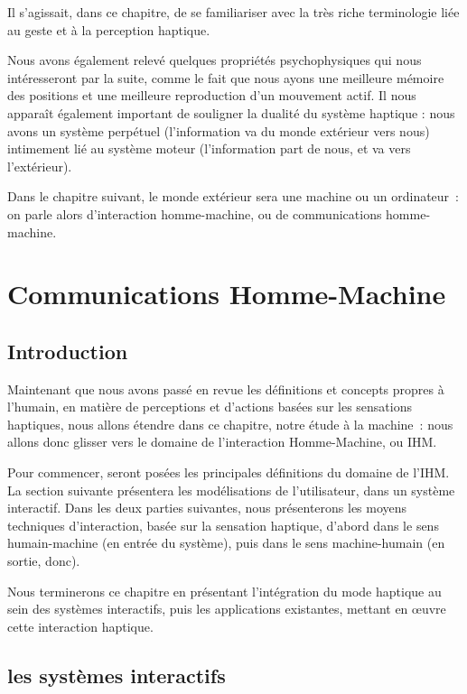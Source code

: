 \documentclass[
]{book}
\begin{document}
Il s'agissait, dans ce chapitre, de se familiariser avec la très riche
terminologie liée au geste et à la perception haptique.

Nous avons également relevé quelques propriétés psychophysiques qui nous
intéresseront par la suite, comme le fait que nous ayons une meilleure
mémoire des positions et une meilleure reproduction d'un mouvement actif. Il
nous apparaît également important de souligner la dualité du système haptique
: nous avons un système perpétuel (l'information va du monde extérieur vers
nous) intimement lié au système moteur (l'information part de nous, et va
vers l'extérieur).

Dans le chapitre suivant, le monde extérieur sera une machine ou un
ordinateur~: on parle alors d'interaction homme-machine, ou de communications
homme-machine.

\hypertarget{communications-homme-machine}{%
\chapter{Communications Homme-Machine}\label{communications-homme-machine}}

\hypertarget{introduction-2}{%
\section{Introduction}\label{introduction-2}}

Maintenant que nous avons passé en revue les définitions et concepts
propres à l'humain, en matière de perceptions et d'actions basées sur les
sensations haptiques, nous allons étendre dans ce chapitre, notre étude à la
machine~: nous allons donc glisser vers le domaine de l'interaction
Homme-Machine, ou IHM.

Pour commencer, seront posées les principales définitions du domaine de
l'IHM. La section suivante présentera les modélisations de l'utilisateur,
dans un système interactif. Dans les deux parties suivantes, nous
présenterons les moyens techniques d'interaction, basée sur la sensation
haptique, d'abord dans le sens humain-machine (en entrée du système), puis
dans le sens machine-humain (en sortie, donc).

Nous terminerons ce chapitre en présentant l'intégration du mode haptique
au sein des systèmes interactifs, puis les applications existantes, mettant
en œuvre cette interaction haptique.

\hypertarget{les-systuxe8mes-interactifs}{%
\section{les systèmes interactifs}\label{les-systuxe8mes-interactifs}}
\end{document}
